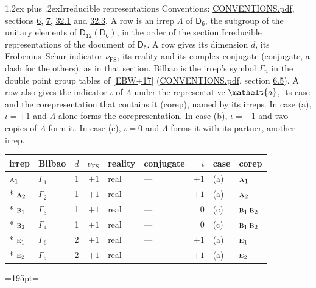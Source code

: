 \documentclass[10pt,a4paper]{article}
\makeatletter
\renewcommand\section{\@startsection{section}{1}{\z@}{-3ex plus -1ex minus -.2ex}%
  {1.2ex plus .2ex}{\normalfont\large\sffamily\bfseries\color{parttitle}}}
\newcommand{\needspace}[1]{\par\penalty-100\begingroup\dimen0=#1\relax\dimen2=\pagegoal
  \advance\dimen2-\pagetotal\ifdim\dimen0>\dimen2\relax\ifdim\dimen2>0pt\vfil\break\fi\fi
  \endgroup}
\numberwithin{equation}{section}
\newcommand{\eltfont}[1]{{\let\sigma\eltsigma\mathelt{#1}}}
\newcommand{\grp}[1]{\mathsf{#1}}
\newcommand{\irr}[1]{\text{\normalfont\scshape #1}}
\newcommand{\elt}[1]{\eltfont{#1}}
\newcommand{\fsind}{\nu_{\mathrm{FS}}}
\makeatother
\begin{document}
\section{Irreducible representations}\label{s:irreps}
Conventions: \href{../../CONVENTIONS.pdf}{CONVENTIONS.pdf}, sections \href{../../../rotation/CONVENTIONS.pdf\#conv.6}{6}, \href{../../../rotation/CONVENTIONS.pdf\#conv.7}{7}, \href{../../CONVENTIONS.pdf\#conv.32.1}{32.1} and \href{../../CONVENTIONS.pdf\#conv.32.3}{32.3}.
\leavevmode\label{n:irrep.Delta}A row is an irrep $\Lambda$ of $\grp{D_{6}}$, the subgroup of the unitary elements of $\grp{D_{12}}(\grp{D_{6}})$, in the order of the section Irreducible representations of the document of \href{../../../rotation/data/pdf/D6.pdf}{$\grp{D_{6}}$}. \label{n:index.dimension}\label{n:index.frobenius}\label{n:head.irrep}\label{n:head.reality}\label{n:head.conjugate}A row gives its dimension $d$, its Frobenius--Schur indicator $\fsind$, its reality and its complex conjugate (conjugate, a dash for the others), as in that section. \label{n:head.bilbao}\label{n:irrep.alias.gamma}Bilbao is the irrep's symbol $\Gamma_n$ in the double point group tables of [\href{../../../REFERENCES.pdf\#ref.EBW+17}{EBW+17}] (\href{../../CONVENTIONS.pdf}{CONVENTIONS.pdf}, section \href{../../../rotation/CONVENTIONS.pdf\#conv.6.5}{6.5}). \label{n:head.case.corep}\label{n:head.corep}A row also gives the indicator $\iota$ of $\Lambda$ under the representative $\elt{a}$, its case and the corepresentation that contains it (corep), named by its irreps. In case (a), $\iota = +1$ and $\Lambda$ alone forms the corepresentation. In case (b), $\iota = -1$ and two copies of $\Lambda$ form it. In case (c), $\iota = 0$ and $\Lambda$ forms it with its partner, another irrep.
\setlength{\emergencystretch}{2em}\par\setlength{\emergencystretch}{0pt}
{\small\renewcommand{\arraystretch}{1.25}\setlength{\tabcolsep}{4pt}\begin{longtable}{@{}llrrllrll@{}}\toprule
irrep & Bilbao & $d$ & $\fsind$ & reality & conjugate & $\iota$ & case & corep\\\midrule\endhead
\bottomrule\endfoot\endlastfoot
$\irr{a}_{1}$ & $\Gamma_{1}$ & 1 & $+1$ & real & --- & $+1$ & (a) & $\irr{a}_{1}$\\*
$\irr{a}_{2}$ & $\Gamma_{2}$ & 1 & $+1$ & real & --- & $+1$ & (a) & $\irr{a}_{2}$\\*
$\irr{b}_{1}$ & $\Gamma_{3}$ & 1 & $+1$ & real & --- & $0$ & (c) & $\irr{b}_{1}\,\irr{b}_{2}$\\*
$\irr{b}_{2}$ & $\Gamma_{4}$ & 1 & $+1$ & real & --- & $0$ & (c) & $\irr{b}_{1}\,\irr{b}_{2}$\\*
$\irr{e}_{1}$ & $\Gamma_{6}$ & 2 & $+1$ & real & --- & $+1$ & (a) & $\irr{e}_{1}$\\*
$\irr{e}_{2}$ & $\Gamma_{5}$ & 2 & $+1$ & real & --- & $+1$ & (a) & $\irr{e}_{2}$\\
\bottomrule\end{longtable}}
\needspace{195pt}
\end{document}
